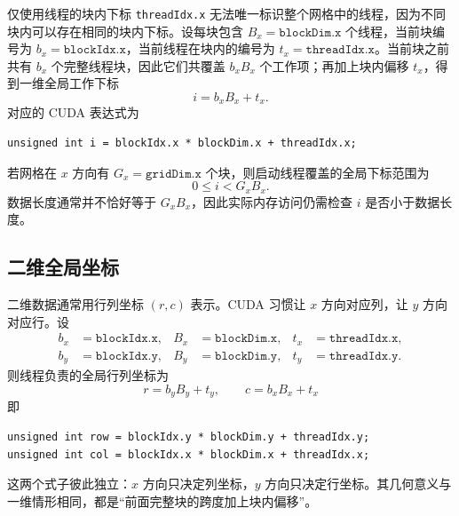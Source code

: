 仅使用线程的块内下标 \texttt{threadIdx.x} 无法唯一标识整个网格中的线程，因为不同块内可以存在相同的块内下标。设每块包含 $B_x=\texttt{blockDim.x}$ 个线程，当前块编号为 $b_x=\texttt{blockIdx.x}$，当前线程在块内的编号为 $t_x=\texttt{threadIdx.x}$。当前块之前共有 $b_x$ 个完整线程块，因此它们共覆盖 $b_xB_x$ 个工作项；再加上块内偏移 $t_x$，得到一维全局工作下标
\[
  i=b_xB_x+t_x.
\]
对应的 CUDA 表达式为
\par\noindent\begin{minipage}{\linewidth}
\begin{lstlisting}[caption={一维全局工作下标}]
unsigned int i = blockIdx.x * blockDim.x + threadIdx.x;
\end{lstlisting}
\end{minipage}\par

若网格在 $x$ 方向有 $G_x=\texttt{gridDim.x}$ 个块，则启动线程覆盖的全局下标范围为
\[
0\leq i<G_xB_x.
\]
数据长度通常并不恰好等于 $G_xB_x$，因此实际内存访问仍需检查 $i$ 是否小于数据长度。

\subsection{二维全局坐标}

二维数据通常用行列坐标 $(r,c)$ 表示。CUDA 习惯让 $x$ 方向对应列，让 $y$ 方向对应行。设
\[
\begin{aligned}
 b_x&=\texttt{blockIdx.x}, & B_x&=\texttt{blockDim.x}, & t_x&=\texttt{threadIdx.x},\\
 b_y&=\texttt{blockIdx.y}, & B_y&=\texttt{blockDim.y}, & t_y&=\texttt{threadIdx.y}.
\end{aligned}
\]
则线程负责的全局行列坐标为
\[
\boxed{
  r=b_yB_y+t_y,\qquad c=b_xB_x+t_x
}
\]
即
\par\noindent\begin{minipage}{\linewidth}
\begin{lstlisting}[caption={二维线程坐标到全局数据坐标的映射}]
unsigned int row = blockIdx.y * blockDim.y + threadIdx.y;
unsigned int col = blockIdx.x * blockDim.x + threadIdx.x;
\end{lstlisting}
\end{minipage}\par

这两个式子彼此独立：$x$ 方向只决定列坐标，$y$ 方向只决定行坐标。其几何意义与一维情形相同，都是“前面完整块的跨度加上块内偏移”。

